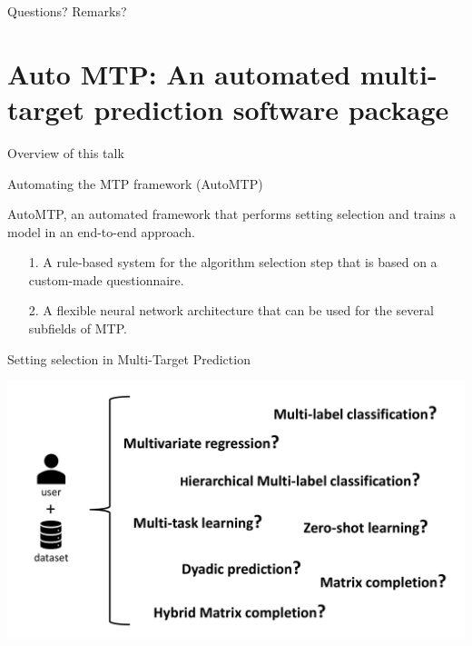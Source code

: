 \documentclass[]{beamer}
\begin{document}
\begin{frame}{Questions? Remarks?}
\end{frame}

\section{Auto MTP: An automated multi-target prediction software package}

\begin{frame}{Overview of this talk}

\tableofcontents

\end{frame}

\begin{frame}{Automating the MTP framework (AutoMTP)}

 \begin{center}
 AutoMTP, an automated framework that performs setting selection and trains a model in an end-to-end approach.
 \end{center}
 
\begin{itemize}
\item[1.] A rule-based system for the algorithm selection step that is based on a custom-made questionnaire.
\item[2.] A flexible neural network architecture that can be used for the several subfields of MTP.
\end{itemize}


\end{frame}

\begin{frame}{Setting selection in Multi-Target Prediction}
\begin{center}
\includegraphics[width=\textwidth]{Dimitris_figures/MTPchoices.pdf}
\end{center}
\end{frame}
\end{document}
